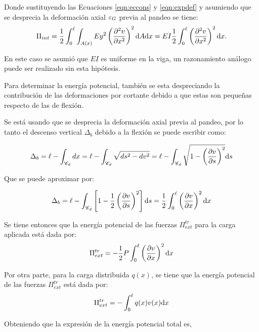 Donde sustituyendo las Ecuaciones \eqref{eqn:eccons} y \eqref{eqn:expdef} y asumiendo que se desprecia la deformación axial $\varepsilon_G$ previa al pandeo se tiene:
%
\begin{equation}
\Pi_{int} = \frac{1}{2} \int_0^\ell \int_{A(x)} E y^2 \left( \frac{\partial^2 v}{\partial x^2}\right)^2  {\text{d}} A {\text{d}} x 
=  E I  \frac{1}{2} \int_0^\ell \left( \frac{\partial^2 v}{\partial x^2}\right)^2 {\text{d}} x.
\end{equation}

En este caso se asumió que $EI$ es uniforme en la viga, un razonamiento análogo puede ser realizado sin esta hipótesis.

Para determinar la energía potencial, también se esta despreciando la contribución de las deformaciones por cortante debido a que estas son pequeñas respecto de las de flexión.

Se está usando que se desprecia la deformación axial previa al pandeo, por lo tanto el descenso vertical $\Delta_b$ debido a la flexión se puede escribir como:

\begin{equation}
\Delta_b = \ell - \int_{\mathscr{C}_d} dx = \ell - \int_{\mathscr{C}_d} \sqrt{ds^2-dv^2} = \ell - 
\int_{\mathscr{C}_d} \sqrt{1-\left(\frac{\partial v}{\partial s}\right)^2} {\text{d}} s
\end{equation}

Que se puede aproximar por:

\begin{equation}\label{eqn:deltab}
\Delta_b = \ell - \int_{\mathscr{C}_d} \left[1 - \frac{1}{2}\left(\frac{\partial v}{\partial s}\right)^2\right] {\text{d}} s = \frac{1}{2} \int_0^\ell \left(\frac{\partial v}{\partial x}\right)^2 {\text{d}} x
\end{equation}

Se tiene entonces que la energía potencial de las fuerzas $\Pi^{tr}_{ext}$ para la carga aplicada está dada por:
\begin{equation}
\Pi_{ext}^{tr} = -\frac{1}{2} P \int_0^\ell  \left(\frac{\partial v}{\partial x}\right)^2 {\text{d}} x
\end{equation}

Por otra parte, para la carga distribuida $q(x)$, se tiene que la energía potencial de las fuerzas $\Pi^{tr}_{ext}$ está dada por:
\begin{equation}
\Pi_{ext}^{tr} =
- \int_0^\ell q(x) v(x) {\text{d}} x
\end{equation}

Obteniendo que la expresión de la energía potencial total es,

